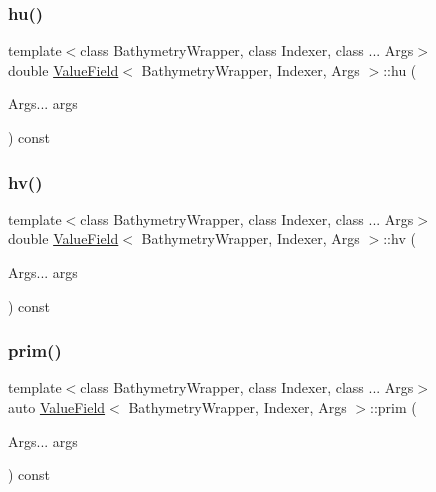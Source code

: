 \mbox{\label{structValueField_aa948302bce594b03219aacdee605750b}} 
\subsubsection{\texorpdfstring{hu()}{hu()}}
{\footnotesize\ttfamily template$<$class Bathymetry\+Wrapper, class Indexer, class ... Args$>$ \\
double \hyperlink{structValueField}{Value\+Field}$<$ Bathymetry\+Wrapper, Indexer, Args $>$\+::hu (\begin{DoxyParamCaption}\item[{Args...}]{args }\end{DoxyParamCaption}) const\hspace{0.3cm}{\ttfamily [inline]}}

\mbox{\label{structValueField_a8e1614ed3507e7813ae7392450239c70}} 
\subsubsection{\texorpdfstring{hv()}{hv()}}
{\footnotesize\ttfamily template$<$class Bathymetry\+Wrapper, class Indexer, class ... Args$>$ \\
double \hyperlink{structValueField}{Value\+Field}$<$ Bathymetry\+Wrapper, Indexer, Args $>$\+::hv (\begin{DoxyParamCaption}\item[{Args...}]{args }\end{DoxyParamCaption}) const\hspace{0.3cm}{\ttfamily [inline]}}

\mbox{\label{structValueField_a62a3819a67553452878a8925354b5631}} 
\subsubsection{\texorpdfstring{prim()}{prim()}\hspace{0.1cm}{\footnotesize\ttfamily [1/2]}}
{\footnotesize\ttfamily template$<$class Bathymetry\+Wrapper, class Indexer, class ... Args$>$ \\
auto \hyperlink{structValueField}{Value\+Field}$<$ Bathymetry\+Wrapper, Indexer, Args $>$\+::prim (\begin{DoxyParamCaption}\item[{Args...}]{args }\end{DoxyParamCaption}) const\hspace{0.3cm}{\ttfamily [inline]}}


